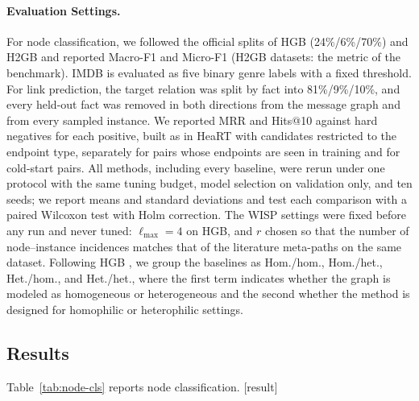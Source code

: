 \documentclass{article}
\newcommand{\wisp}{\textsc{WISP}}
\newcommand{\res}{{\scriptsize[result]}}
\begin{document}
\paragraph{Evaluation Settings.}
For node classification, we followed the official splits of HGB (24\%/6\%/70\%) and H2GB and reported Macro-F1 and Micro-F1 (H2GB datasets: the metric of the benchmark). IMDB is evaluated as five binary genre labels with a fixed threshold. For link prediction, the target relation was split by fact into 81\%/9\%/10\%, and every held-out fact was removed in both directions from the message graph and from every sampled instance. We reported MRR and Hits@10 against hard negatives for each positive, built as in HeaRT \cite{li2023heart} with candidates restricted to the endpoint type, separately for pairs whose endpoints are seen in training and for cold-start pairs. All methods, including every baseline, were rerun under one protocol with the same tuning budget, model selection on validation only, and ten seeds; we report means and standard deviations and test each comparison with a paired Wilcoxon test with Holm correction. The \wisp{} settings were fixed before any run and never tuned: $\ell_{\max}=4$ on HGB, and $r$ chosen so that the number of node--instance incidences matches that of the literature meta-paths on the same dataset. Following HGB \cite{lv2021hgb}, we group the baselines as Hom./hom., Hom./het., Het./hom., and Het./het., where the first term indicates whether the graph is modeled as homogeneous or heterogeneous and the second whether the method is designed for homophilic or heterophilic settings.

\subsection{Results}
\label{sec:results}

Table~\ref{tab:node-cls} reports node classification. \res{}
\end{document}
